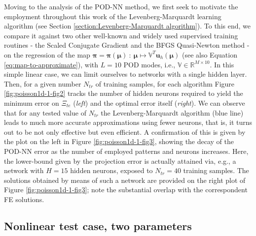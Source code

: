 \documentclass[12pt, a4paper, twoside, openright]{report}
\numberwithin{equation}{chapter}
\theoremstyle{theorem}
\theoremstyle{definition}
\theoremstyle{remark}
\theoremstyle{proposition}
\numberwithin{figure}{chapter}
\newcommand{\bg}[1]{\boldsymbol{#1}}
\begin{document}
		Moving to the analysis of the POD-NN method, we first seek to motivate the employment throughout this work of the Levenberg-Marquardt learning algorithm (see Section \ref{section:Levenberg-Marquardt algorithm}). To this end, we compare it against two other well-known and widely used supervised training routines - the Scaled Conjugate Gradient \cite{Mol93} and the BFGS Quasi-Newton method \cite{GMW81} - on the regression of the map $\bg{\pi} = \bg{\pi}(\bg{\mu}) ~ : ~ \bg{\mu} \mapsto \mathbb{V}^T \mathbf{u}_h(\bg{\mu})$ (see also Equation \eqref{eq:map-to-approximate}), with $L = 10$ POD modes, i.e., $\mathbb{V} \in \mathbb{R}^{M \times 10}$. In this simple linear case, we can limit ourselves to networks with a single hidden layer. Then, for a given number $N_{tr}$ of training samples, for each algorithm Figure \ref{fig:poisson1d-1-fig2} tracks the number of hidden neurons required to yield the minimum error on $\Xi_{te}$ (\emph{left}) and the optimal error itself (\emph{right}). We can observe that for any tested value of $N_{tr}$ the Levenberg-Marquardt algorithm (blue line) leads to much more accurate approximations using fewer neurons, that is, it turns out to be not only effective but even efficient. A confirmation of this is given by the plot on the left in Figure \ref{fig:poisson1d-1-fig3}, showing the decay of the POD-NN error as the number of employed patterns and neurons increases. Here, the lower-bound given by the projection error is actually attained via, e.g., a network with $H = 15$ hidden neurons, exposed to $N_{tr} = 40$ training samples. The solutions obtained by means of such a network are provided on the right plot of Figure \ref{fig:poisson1d-1-fig3}; note the substantial overlap with the correspondent FE solutions. 
				
	\subsection{Nonlinear test case, two parameters}
	\label{section:poisson1d-2}
	
\end{document}
